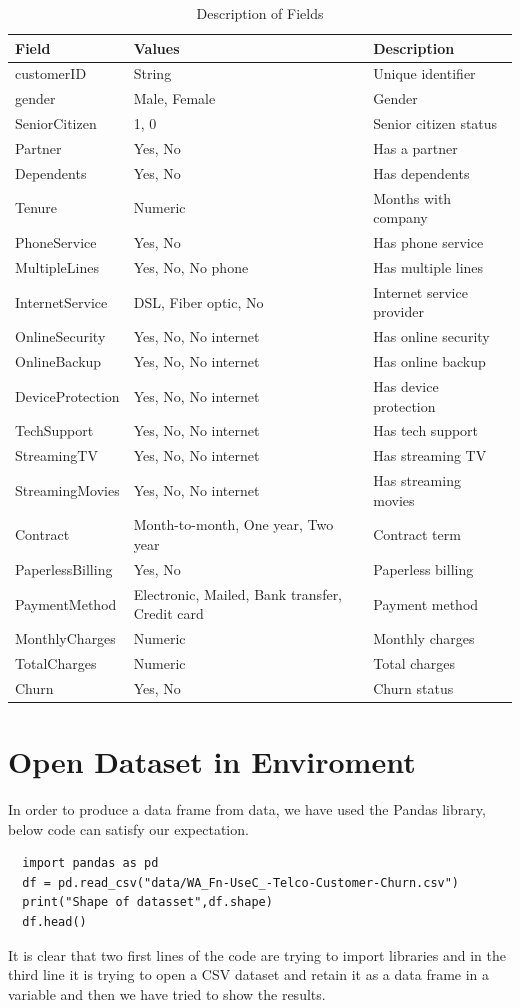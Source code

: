 \documentclass[12pt]{article}
\begin{document}
\begin{table}[ht]
  \centering
  \small
  \begin{tabular}{|l|l|l|}
    \hline
    \textbf{Field} & \textbf{Values} & \textbf{Description} \\
    \hline
    customerID & String & Unique identifier \\
    gender & Male, Female & Gender \\
    SeniorCitizen & 1, 0 & Senior citizen status \\
    Partner & Yes, No & Has a partner \\
    Dependents & Yes, No & Has dependents \\
    Tenure & Numeric & Months with company \\
    PhoneService & Yes, No & Has phone service \\
    MultipleLines & Yes, No, No phone & Has multiple lines \\
    InternetService & DSL, Fiber optic, No & Internet service provider \\
    OnlineSecurity & Yes, No, No internet & Has online security \\
    OnlineBackup & Yes, No, No internet & Has online backup \\
    DeviceProtection & Yes, No, No internet & Has device protection \\
    TechSupport & Yes, No, No internet & Has tech support \\
    StreamingTV & Yes, No, No internet & Has streaming TV \\
    StreamingMovies & Yes, No, No internet & Has streaming movies \\
    Contract & Month-to-month, One year, Two year & Contract term \\
    PaperlessBilling & Yes, No & Paperless billing \\
    PaymentMethod & Electronic, Mailed, Bank transfer, Credit card & Payment method \\
    MonthlyCharges & Numeric & Monthly charges \\
    TotalCharges & Numeric & Total charges \\
    Churn & Yes, No & Churn status \\
    \hline
  \end{tabular}
  \caption{Description of Fields}
  \end{table}
  

\newpage
\section{Open Dataset in Enviroment}
In order to produce a data frame from data, we have used the Pandas library, below code can satisfy our expectation.
\begin{lstlisting}
  import pandas as pd
  df = pd.read_csv("data/WA_Fn-UseC_-Telco-Customer-Churn.csv")
  print("Shape of datasset",df.shape)
  df.head()
  \end{lstlisting}
  It is clear that two first lines of the code are trying to import libraries and in the third line it is trying to open a CSV dataset and retain it as a data frame in a variable and then we have tried to show the results.
\end{document}
